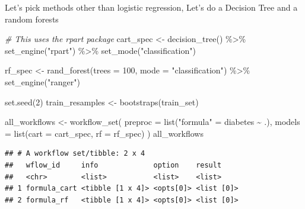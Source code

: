 \documentclass[
]{article}
\newenvironment{Shaded}{\begin{snugshade}}{\end{snugshade}}
\newcommand{\AttributeTok}[1]{\textcolor[rgb]{0.77,0.63,0.00}{#1}}
\newcommand{\CommentTok}[1]{\textcolor[rgb]{0.56,0.35,0.01}{\textit{#1}}}
\newcommand{\DecValTok}[1]{\textcolor[rgb]{0.00,0.00,0.81}{#1}}
\newcommand{\FunctionTok}[1]{\textcolor[rgb]{0.00,0.00,0.00}{#1}}
\newcommand{\NormalTok}[1]{#1}
\newcommand{\OtherTok}[1]{\textcolor[rgb]{0.56,0.35,0.01}{#1}}
\newcommand{\SpecialCharTok}[1]{\textcolor[rgb]{0.00,0.00,0.00}{#1}}
\newcommand{\StringTok}[1]{\textcolor[rgb]{0.31,0.60,0.02}{#1}}
\begin{document}
Let's pick methods other than logistic regression, Let's do a Decision
Tree and a random forests

\begin{Shaded}
\begin{Highlighting}[]
\CommentTok{\# This uses the rpart package}
\NormalTok{cart\_spec }\OtherTok{\textless{}{-}} 
  \FunctionTok{decision\_tree}\NormalTok{() }\SpecialCharTok{\%\textgreater{}\%} 
  \FunctionTok{set\_engine}\NormalTok{(}\StringTok{"rpart"}\NormalTok{) }\SpecialCharTok{\%\textgreater{}\%} 
  \FunctionTok{set\_mode}\NormalTok{(}\StringTok{"classification"}\NormalTok{)}

\NormalTok{rf\_spec }\OtherTok{\textless{}{-}} \FunctionTok{rand\_forest}\NormalTok{(}\AttributeTok{trees =} \DecValTok{100}\NormalTok{, }\AttributeTok{mode =} \StringTok{"classification"}\NormalTok{) }\SpecialCharTok{\%\textgreater{}\%}
  \FunctionTok{set\_engine}\NormalTok{(}\StringTok{"ranger"}\NormalTok{)}
\end{Highlighting}
\end{Shaded}

\begin{Shaded}
\begin{Highlighting}[]
\FunctionTok{set.seed}\NormalTok{(}\DecValTok{2}\NormalTok{)}
\NormalTok{train\_resamples }\OtherTok{\textless{}{-}} \FunctionTok{bootstraps}\NormalTok{(train\_set)}
\end{Highlighting}
\end{Shaded}

\begin{Shaded}
\begin{Highlighting}[]
\NormalTok{all\_workflows }\OtherTok{\textless{}{-}} 
  \FunctionTok{workflow\_set}\NormalTok{(}
    \AttributeTok{preproc =} \FunctionTok{list}\NormalTok{(}\StringTok{"formula"} \OtherTok{=}\NormalTok{ diabetes }\SpecialCharTok{\textasciitilde{}}\NormalTok{ .),}
    \AttributeTok{models =} \FunctionTok{list}\NormalTok{(}\AttributeTok{cart =}\NormalTok{ cart\_spec, }\AttributeTok{rf =}\NormalTok{ rf\_spec)}
\NormalTok{  )}
\NormalTok{all\_workflows}
\end{Highlighting}
\end{Shaded}

\begin{verbatim}
## # A workflow set/tibble: 2 x 4
##   wflow_id     info             option    result    
##   <chr>        <list>           <list>    <list>    
## 1 formula_cart <tibble [1 x 4]> <opts[0]> <list [0]>
## 2 formula_rf   <tibble [1 x 4]> <opts[0]> <list [0]>
\end{verbatim}
\end{document}
